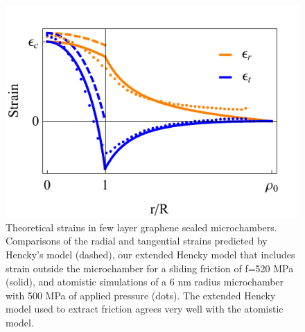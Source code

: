 \begin{figure}
	\begin{center}
	\includegraphics{Figs_Friction/Figure_3.pdf}
	\end{center}
	\caption[Theoretical strains in few layer graphene sealed microchambers]{\label{fig:fri:theory} Theoretical strains in few layer graphene sealed microchambers. Comparisons of the radial and tangential strains predicted by Hencky's model (dashed), our extended Hencky model that includes strain outside the microchamber for a sliding friction of f=520 MPa (solid), and atomistic simulations of a 6 nm radius microchamber with 500 MPa of applied pressure (dots). The extended Hencky model used to extract friction agrees very well with the atomistic model.}
\end{figure}

